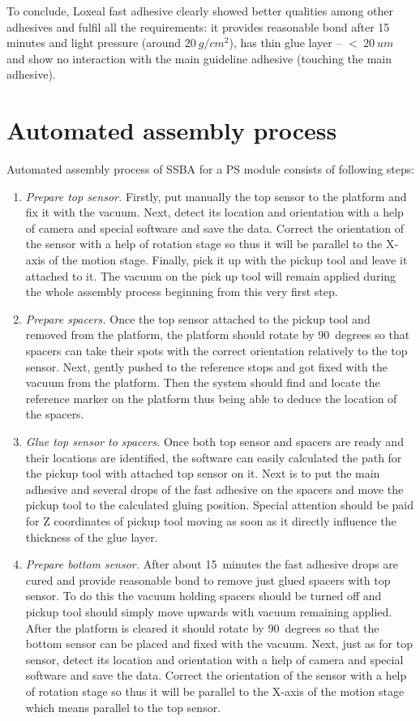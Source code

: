 To conclude, Loxeal fast adhesive clearly showed better qualities among other adhesives and fulfil all the requirements: it provides reasonable bond after 15 minutes and light pressure (around $20~g/cm^{2}$), has thin glue layer -- $<~20~um$ and show no interaction with the main guideline adhesive (touching the main adhesive).

\section{Automated assembly process}

Automated assembly process of SSBA for a PS module consists of following steps:

\begin{enumerate}
\setlength\itemsep{-0.5em}
\item \emph{Prepare top sensor.} Firstly, put manually the top sensor to the platform and fix it with the vacuum. Next, detect its location and orientation with a help of camera and special software and save the data. Correct the orientation of the sensor with a help of rotation stage so thus it will be parallel to the X-axis of the motion stage. Finally, pick it up with the pickup tool and leave it attached to it. The vacuum on the pick up tool will remain applied during the whole assembly process beginning from this very first step.
\item \emph{Prepare spacers.} Once the top sensor attached to the pickup tool and removed from the platform, the platform should rotate by 90~degrees so that spacers can take their spots with the correct orientation relatively to the top sensor. Next, gently pushed to the reference stops and got fixed with the vacuum from the platform. Then the system should find and locate the reference marker on the platform thus being able to deduce the location of the spacers.
\item \emph{Glue top sensor to spacers.} Once both top sensor and spacers are ready and their locations are identified, the software can easily calculated the path for the pickup tool with attached top sensor on it. Next is to put the main adhesive and several drops of the fast adhesive on the spacers and move the pickup tool to the calculated gluing position. Special attention should be paid for Z coordinates of pickup tool moving as soon as it directly influence the thickness of the glue layer.
\item \emph{Prepare bottom sensor.} After about 15~minutes the fast adhesive drops are cured and provide reasonable bond to remove just glued spacers with top sensor. To do this the vacuum holding spacers should be turned off and pickup tool should simply move upwards with vacuum remaining applied. After the platform is cleared it should rotate by 90~degrees so that the bottom sensor can be placed and fixed with the vacuum. Next, just as for top sensor, detect its location and orientation with a help of camera and special software and save the data. Correct the orientation of the sensor with a help of rotation stage so thus it will be parallel to the X-axis of the motion stage which means parallel to the top sensor.

\end{enumerate}
